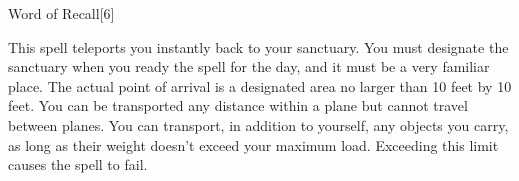 \begin{spellsection}{Word of Recall}[6]
    \begin{spellheader}
    \end{spellheader}
    \begin{spellcontent}
        \begin{spelltargetinginfo}
        \end{spelltargetinginfo}
        \begin{spelleffects}
            \spelleffect This spell teleports you instantly back to your sanctuary. You must designate the sanctuary when you ready the spell for the day, and it must be a very familiar place. The actual point of arrival is a designated area no larger than 10 feet by 10 feet. You can be transported any distance within a plane but cannot travel between planes. You can transport, in addition to yourself, any objects you carry, as long as their weight doesn't exceed your maximum load. Exceeding this limit causes the spell to fail.
        \end{spelleffects}
    \end{spellcontent}
    \begin{spellfooter}
        \miscastexplode
    \end{spellfooter}
\end{spellsection}

